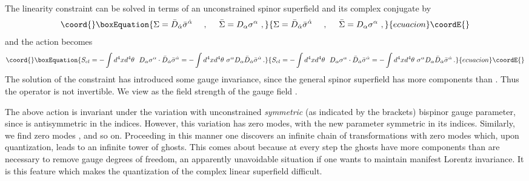 \documentclass[a4paper,12pt]{article}
\begin{document}
The linearity constraint can be solved in terms of an unconstrained
spinor superfield and its complex conjugate by
\begin{equation}\coord{}\boxEquation{
\Sigma = \bar D _{\dot\alpha} \bar\sigma^{\dot\alpha} ~~~~,~~~~
\bar\Sigma = D_\alpha \sigma^\alpha \ , 
}{
\Sigma = \bar D _{\dot\alpha} \bar\sigma^{\dot\alpha} ~~~~,~~~~
\bar\Sigma = D_\alpha \sigma^\alpha \ , 
}{ecuacion}\coordE{}\end{equation}
and the action becomes
\begin{equation}\coord{}\boxEquation{
S_{cl}= -\int d^4x d^4 \theta ~~D_\alpha \sigma^\alpha \cdot \bar
D_{\dot\alpha} \bar\sigma^{\dot\alpha}
=-\int d^4x d^4 \theta  ~\sigma^\alpha D_\alpha \bar D_{\dot\alpha}
\bar\sigma^{\dot\alpha} \, .
\label{Scl}
}{
S_{cl}= -\int d^4x d^4 \theta ~~D_\alpha \sigma^\alpha \cdot \bar
D_{\dot\alpha} \bar\sigma^{\dot\alpha}
=-\int d^4x d^4 \theta  ~\sigma^\alpha D_\alpha \bar D_{\dot\alpha}
\bar\sigma^{\dot\alpha} \, .
}{ecuacion}\coordE{}\end{equation}
The solution of the constraint has introduced some gauge invariance,
since the general spinor superfield \myHighlight{$\sigma^\alpha$}\coordHE{} has more
components than \myHighlight{$\Sigma$}\coordHE{}. Thus 
the operator \coordHE{} is not invertible.
We view \myHighlight{$\Sigma$}\coordHE{} as the field strength of the gauge field \myHighlight{$\sigma^\alpha$}\coordHE{}.

The above action is invariant under the variation \coordHE{} with unconstrained
{\em symmetric} (as indicated by the brackets) bispinor gauge
parameter, since \coordHE{} is antisymmetric in the indices.
However, this variation has zero modes, \coordHE{} with the new
parameter symmetric in its indices.  Similarly, we find zero modes
\coordHE{}, and so on. Proceeding in this manner one discovers
an infinite chain of transformations with zero modes which, upon
quantization, leads to an infinite tower of ghosts. This comes about
because at every step the ghosts have more components than are
necessary to remove gauge degrees of freedom, an apparently
unavoidable situation if one wants to maintain manifest Lorentz
invariance.  It is this feature which makes the quantization of the
complex linear superfield difficult.
\end{document}
